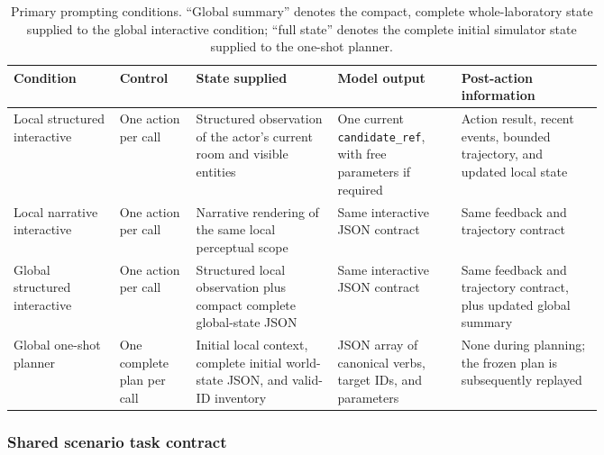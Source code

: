 \begin{table}[htbp]
\centering
\small
\setlength{\tabcolsep}{4pt}
\renewcommand{\arraystretch}{1.12}
\caption{Primary prompting conditions. ``Global summary'' denotes the compact,
complete whole-laboratory state supplied to the global interactive condition;
``full state'' denotes the complete initial simulator state supplied to the
one-shot planner.}
\label{tab:prompt_conditions}
\begin{tabularx}{\linewidth}{
    >{\raggedright\arraybackslash}p{0.18\linewidth}
    >{\raggedright\arraybackslash}p{0.13\linewidth}
    >{\raggedright\arraybackslash}p{0.24\linewidth}
    >{\raggedright\arraybackslash}p{0.21\linewidth}
    >{\raggedright\arraybackslash}X
}
\toprule
\textbf{Condition} & \textbf{Control} & \textbf{State supplied} &
\textbf{Model output} & \textbf{Post-action information} \\
\midrule
Local structured interactive & One action per call & Structured observation of
the actor's current room and visible entities & One current
\texttt{candidate\_ref}, with free parameters if required & Action result,
recent events, bounded trajectory, and updated local state \\
Local narrative interactive & One action per call & Narrative rendering of the
same local perceptual scope & Same interactive JSON contract & Same feedback
and trajectory contract \\
Global structured interactive & One action per call & Structured local
observation plus compact complete global-state JSON & Same interactive JSON
contract & Same feedback and trajectory contract, plus updated global summary \\
Global one-shot planner & One complete plan per call & Initial local context,
complete initial world-state JSON, and valid-ID inventory & JSON array of
canonical verbs, target IDs, and parameters & None during planning; the frozen
plan is subsequently replayed \\
\bottomrule
\end{tabularx}
\end{table}

\subsubsection{Shared scenario task contract}


